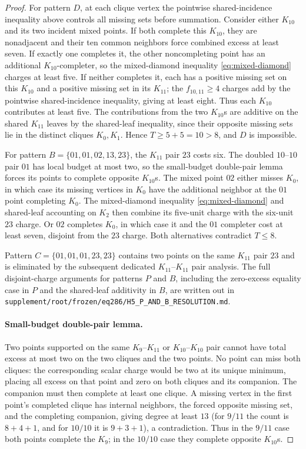 \begin{proof}
For pattern $D$, at each clique vertex the pointwise shared-incidence inequality above controls all missing sets before summation. Consider either $K_{10}$ and its two incident mixed points. If both complete this $K_{10}$, they are nonadjacent and their ten common neighbors force combined excess at least seven. If exactly one completes it, the other noncompleting point has an additional $K_{10}$-completer, so the mixed-diamond inequality \eqref{eq:mixed-diamond} charges at least five. If neither completes it, each has a positive missing set on this $K_{10}$ and a positive missing set in its $K_{11}$; the $f_{10,11}\geq4$ charges add by the pointwise shared-incidence inequality, giving at least eight. Thus each $K_{10}$ contributes at least five. The contributions from the two $K_{10}$s are additive on the shared $K_{11}$ leaves by the shared-leaf inequality, since their opposite missing sets lie in the distinct cliques $K_0,K_1$. Hence $T\geq5+5=10>8$, and $D$ is impossible.

For pattern $B=\{01,01,02,13,23\}$, the $K_{11}$ pair $23$ costs six. The doubled $10$--$10$ pair $01$ has local budget at most two, so the small-budget double-pair lemma forces its points to complete opposite $K_{10}$s. The mixed point $02$ either misses $K_0$, in which case its missing vertices in $K_0$ have the additional neighbor at the $01$ point completing $K_0$. The mixed-diamond inequality \eqref{eq:mixed-diamond} and shared-leaf accounting on $K_2$ then combine its five-unit charge with the six-unit $23$ charge. Or $02$ completes $K_0$, in which case it and the $01$ completer cost at least seven, disjoint from the $23$ charge. Both alternatives contradict $T\leq8$.

Pattern $C=\{01,01,01,23,23\}$ contains two points on the same $K_{11}$ pair $23$ and is eliminated by the subsequent dedicated $K_{11}$--$K_{11}$ pair analysis. The full disjoint-charge arguments for patterns $P$ and $B$, including the zero-excess equality case in $P$ and the shared-leaf additivity in $B$, are written out in \texttt{supplement/root/frozen/eq286/H5\_P\_AND\_B\_RESOLUTION.md}.

\paragraph{Small-budget double-pair lemma.}
Two points supported on the same $K_9$--$K_{11}$ or $K_{10}$--$K_{10}$ pair cannot have total excess at most two on the two cliques and the two points. No point can miss both cliques: the corresponding scalar charge would be two at its unique minimum, placing all excess on that point and zero on both cliques and its companion. The companion must then complete at least one clique. A missing vertex in the first point's completed clique has internal neighbors, the forced opposite missing set, and the completing companion, giving degree at least $13$ (for $9/11$ the count is $8+4+1$, and for $10/10$ it is $9+3+1$), a contradiction. Thus in the $9/11$ case both points complete the $K_9$; in the $10/10$ case they complete opposite $K_{10}$s.


\end{proof}
